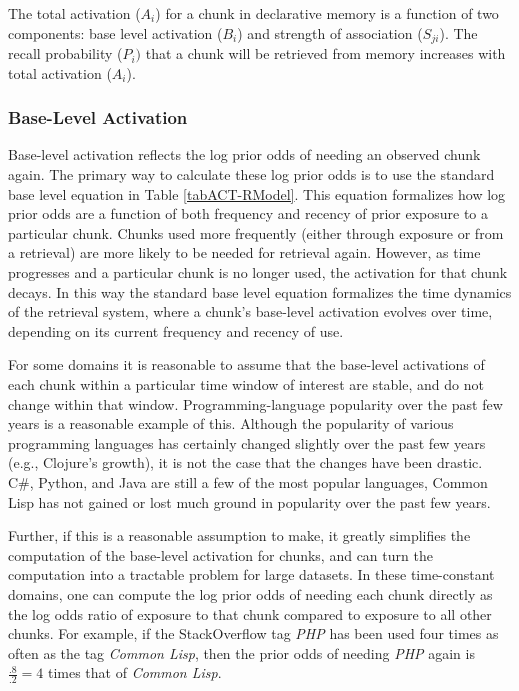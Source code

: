 \documentclass[man,floatsintext,donotrepeattitle]{apa6}
\begin{document}
The total activation ($A_{i}$) for a chunk in declarative memory is a function of two components: base level activation ($B_{i}$) and strength of association ($S_{ji}$).
The recall probability ($P_{i})$ that a chunk will be retrieved from memory increases with total activation ($A_{i}$).

\subsubsection{Base-Level Activation}

Base-level activation reflects the log prior odds of needing an observed chunk again.
The primary way to calculate these log prior odds is to use the standard base level equation in Table \ref{tabACT-RModel}.
This equation formalizes how log prior odds are a function of both frequency and recency of prior exposure to a particular chunk.
Chunks used more frequently (either through exposure or from a retrieval) are more likely to be needed for retrieval again.
However, as time progresses and a particular chunk is no longer used, the activation for that chunk decays.
In this way the standard base level equation formalizes the time dynamics of the retrieval system, where a chunk's base-level activation evolves over time, depending on its current frequency and recency of use.

For some domains it is reasonable to assume that the base-level activations of each chunk within a particular time window of interest are stable, and do not change within that window.
Programming-language popularity over the past few years is a reasonable example of this.
Although the popularity of various programming languages has certainly changed slightly over the past few years (e.g., Clojure's growth), it is not the case that the changes have been drastic.
C\#, Python, and Java are still a few of the most popular languages, Common Lisp has not gained or lost much ground in popularity over the past few years.

Further, if this is a reasonable assumption to make, it greatly simplifies the computation of the base-level activation for chunks, and can turn the computation into a tractable problem for large datasets.
In these time-constant domains, one can compute the log prior odds of needing each chunk directly as the log odds ratio of exposure to that chunk compared to exposure to all other chunks.
For example, if the StackOverflow tag \emph{PHP} has been used four times as often as the tag \emph{Common Lisp}, then the prior odds of needing \emph{PHP} again is $\frac{.8}{.2}=4$ times that of \emph{Common Lisp}.
\end{document}
